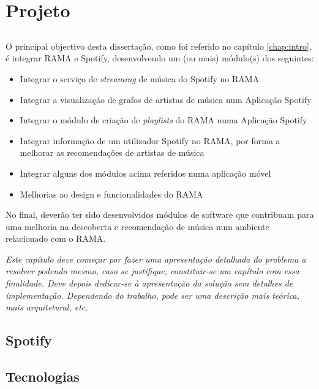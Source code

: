 
\chapter{Projeto}
\label{chap:chap3}

\section*{}

O principal objectivo desta dissertação, como foi referido no capítulo \ref{chap:intro}, é integrar RAMA e Spotify, desenvolvendo um (ou mais) módulo(s) dos seguintes:

\begin{itemize}
  \item Integrar o serviço de \emph{streaming} de música do Spotify no RAMA
  \item Integrar a visualização de grafos de artistas de música num Aplicação Spotify
  \item Integrar o módulo de criação de \emph{playlists} do RAMA numa Aplicação Spotify
  \item Integrar informação de um utilizador Spotify no RAMA, por forma a melhorar as recomendações de artistas de música
  \item Integrar alguns dos módulos acima referidos numa aplicação móvel
  \item Melhorias ao design e funcionalidades do RAMA
\end{itemize}

No final, deverão ter sido desenvolvidos módulos de software que contribuam para uma melhoria na descoberta e recomendação de música num ambiente relacionado com o RAMA.



\emph{ Este capítulo deve começar por fazer uma apresentação detalhada do
problema a resolver podendo mesmo, caso se justifique, constituir-se um capítulo com essa finalidade.
Deve depois dedicar-se à apresentação da solução sem detalhes de
implementação. 
Dependendo do trabalho, pode ser uma descrição mais teórica, mais arquitetural, etc. }


\section{Spotify} %
\label{sec:spotify}



\section{Tecnologias} %
\label{sec:tecnologias}


